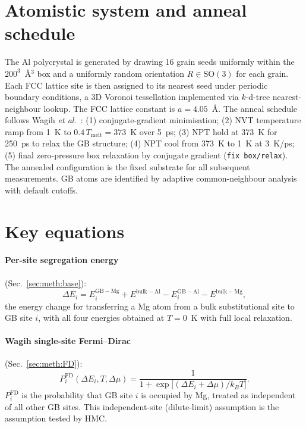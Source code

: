
\appendix

\section{Atomistic system and anneal schedule}\label{app:atomistic}

The Al polycrystal is generated by drawing 16 grain seeds uniformly
within the $200^3$~\AA$^3$ box and a uniformly random orientation
$R \in \mathrm{SO}(3)$ for each grain. Each FCC lattice site is then
assigned to its nearest seed under periodic boundary conditions, a 3D
Voronoi tessellation implemented via $k$-d-tree nearest-neighbour
lookup. The FCC lattice constant is $a = 4.05$~\AA. The anneal
schedule follows Wagih \emph{et al.}~\cite{Wagih2020}:
(1) conjugate-gradient minimisation; (2) NVT temperature ramp from
1~K to $0.4\,T_\mathrm{melt} = 373$~K over 5~ps; (3) NPT hold at
373~K for 250~ps to relax the GB structure; (4) NPT cool from 373~K
to 1~K at 3~K/ps; (5) final zero-pressure box relaxation by conjugate
gradient (\texttt{fix box/relax}). The annealed configuration is the
fixed substrate for all subsequent measurements. GB atoms are
identified by adaptive common-neighbour
analysis~\cite{Stukowski2012} with default cutoffs.


\section{Key equations}\label{app:eq}

\paragraph*{Per-site segregation energy} (Sec.~\ref{sec:meth:base}):
\begin{equation}\label{eq:dE}
\Delta E_i = E_i^\mathrm{GB-Mg} + E^\mathrm{bulk-Al}
           - E_i^\mathrm{GB-Al} - E^\mathrm{bulk-Mg},
\end{equation}
the energy change for transferring a Mg atom from a bulk
substitutional site to GB site $i$, with all four energies obtained
at $T = 0$~K with full local relaxation.

\paragraph*{Wagih single-site Fermi--Dirac}
(Sec.~\ref{sec:meth:FD}):
\begin{equation}\label{eq:FD_single}
P_i^\mathrm{FD}(\Delta E_i, T, \Delta\mu) =
\frac{1}{1 + \exp\!\big[(\Delta E_i + \Delta\mu)/k_B T\big]}.
\end{equation}
$P_i^\mathrm{FD}$ is the probability that GB site $i$ is occupied by
Mg, treated as independent of all other GB sites. This independent-site
(dilute-limit) assumption is the assumption tested by HMC.

